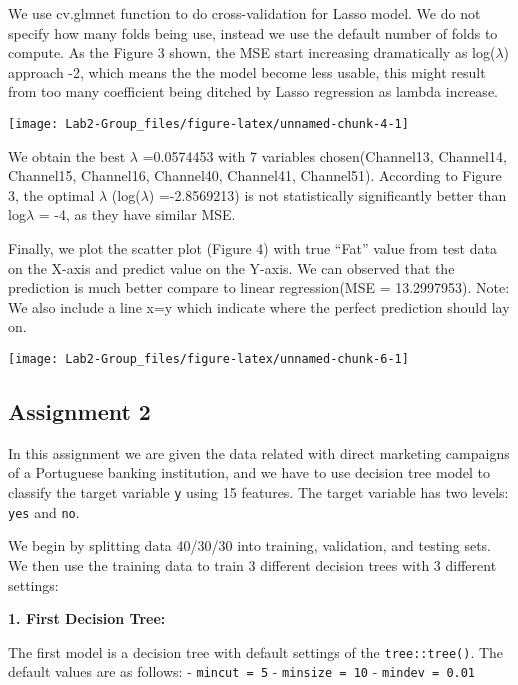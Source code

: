 \documentclass[
]{article}
\begin{document}
We use cv.glmnet function to do cross-validation for Lasso model. We do
not specify how many folds being use, instead we use the default number
of folds to compute. As the Figure 3 shown, the MSE start increasing
dramatically as log(\(\lambda\)) approach -2, which means the the model
become less usable, this might result from too many coefficient being
ditched by Lasso regression as lambda increase.

\begin{center}\texttt{[image: Lab2-Group\_files/figure-latex/unnamed-chunk-4-1]} \end{center}

We obtain the best \(\lambda\) =0.0574453 with 7 variables
chosen(Channel13, Channel14, Channel15, Channel16, Channel40, Channel41,
Channel51). According to Figure 3, the optimal \(\lambda\)
(log(\(\lambda\)) =-2.8569213) is not statistically significantly better
than log\(\lambda\) = -4, as they have similar MSE.

Finally, we plot the scatter plot (Figure 4) with true ``Fat'' value
from test data on the X-axis and predict value on the Y-axis. We can
observed that the prediction is much better compare to linear
regression(MSE = 13.2997953). Note: We also include a line x=y which
indicate where the perfect prediction should lay on.

\begin{center}\texttt{[image: Lab2-Group\_files/figure-latex/unnamed-chunk-6-1]} \end{center}

\hypertarget{assignment-2}{%
\subsection{Assignment 2}\label{assignment-2}}

In this assignment we are given the data related with direct marketing
campaigns of a Portuguese banking institution, and we have to use
decision tree model to classify the target variable \texttt{y} using 15
features. The target variable has two levels: \texttt{yes} and
\texttt{no}.

We begin by splitting data 40/30/30 into training, validation, and
testing sets. We then use the training data to train 3 different
decision trees with 3 different settings:

\textbf{1. First Decision Tree:}

The first model is a decision tree with default settings of the
\texttt{tree::tree()}. The default values are as follows: -
\texttt{mincut\ =\ 5} - \texttt{minsize\ =\ 10} -
\texttt{mindev\ =\ 0.01}
\end{document}
